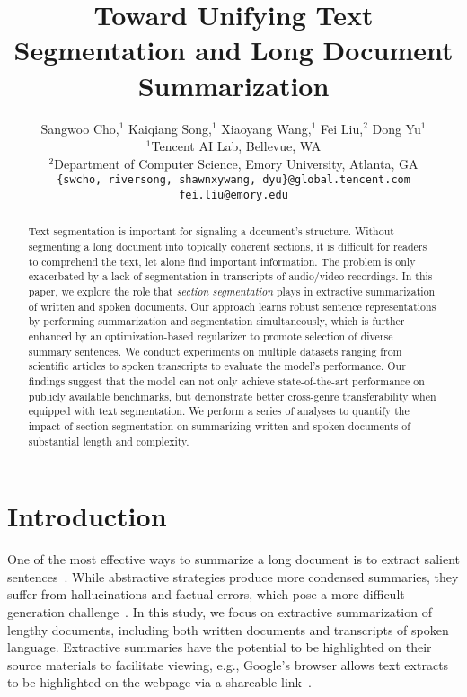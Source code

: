 \documentclass[11pt]{article}
\title{Toward Unifying Text Segmentation and Long Document Summarization}
\author{Sangwoo Cho,$^1$ Kaiqiang Song,$^1$ Xiaoyang Wang,$^1$ Fei Liu,$^2$ Dong Yu$^1$\\[0.6em]
$^1$Tencent AI Lab, Bellevue, WA\\
$^2$Department of Computer Science, Emory University, Atlanta, GA\\[0.6em]
\texttt{\{swcho, riversong, shawnxywang, dyu\}@global.tencent.com}\\ 
\texttt{fei.liu@emory.edu}
}
\begin{document}
\maketitle
\begin{abstract}


Text segmentation is important for signaling a document's structure.
Without segmenting a long document into topically coherent sections,
it is difficult for readers to comprehend the text, let alone find important information.
The problem is only exacerbated by a lack of segmentation in transcripts of audio/video recordings. 
In this paper, we explore the role that \emph{section segmentation} plays
in extractive summarization of written and spoken documents. 
Our approach learns robust sentence representations by performing summarization and segmentation simultaneously,
which is further enhanced by an optimization-based regularizer to promote selection of diverse summary sentences.
We conduct experiments on multiple datasets ranging from scientific articles to spoken transcripts to evaluate the model's performance.
Our findings suggest that the model can not only achieve state-of-the-art performance on publicly available benchmarks,
but demonstrate better cross-genre transferability when equipped with text segmentation.
We perform a series of analyses to quantify the impact of section segmentation on 
summarizing written and spoken documents of substantial length and complexity. 



\end{abstract}

\section{Introduction}


One of the most effective ways to summarize a long document is to extract salient sentences~\cite{goldstein-etal-2000-multi}.
While abstractive strategies produce more condensed summaries,
they suffer from hallucinations and factual errors,
which pose a more difficult generation challenge~\cite{lebanoff-etal-2020-understanding,goyal-durrett-2021-annotating}.
In this study, we focus on extractive summarization of lengthy documents,
including both written documents and transcripts of spoken language.
Extractive summaries have the potential to be highlighted on their source materials to facilitate viewing,
e.g., Google's browser allows text extracts to be highlighted on the webpage via a shareable link~\cite{HighlightedLinks:2021}.
\end{document}
